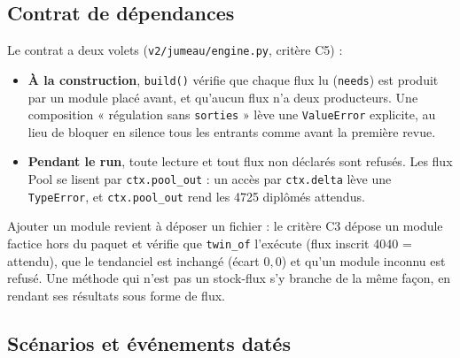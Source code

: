 \subsection{Contrat de dépendances}\label{jum:contrat}

Le contrat a deux volets (\texttt{v2/jumeau/engine.py}, critère C5) :
\begin{itemize}
  \item \textbf{À la construction}, \texttt{build()} vérifie que chaque flux lu (\texttt{needs}) est produit par
        un module placé avant, et qu'aucun flux n'a deux producteurs. Une composition « régulation sans
        \texttt{sorties} » lève une \texttt{ValueError} explicite\mesure{}, au lieu de bloquer en silence tous
        les entrants comme avant la première revue.
  \item \textbf{Pendant le run}, toute lecture et tout flux non déclarés sont refusés. Les flux Pool se lisent
        par \texttt{ctx.pool\_out} : un accès par \texttt{ctx.delta} lève une \texttt{TypeError}\mesure{}, et
        \texttt{ctx.pool\_out} rend les \num{4725}\mesure{} diplômés attendus.
\end{itemize}
Ajouter un module revient à déposer un fichier : le critère C3 dépose un module factice hors du paquet et
vérifie que \texttt{twin\_of} l'exécute (flux inscrit \num{4040}\mesure{} = attendu), que le tendanciel est
inchangé (écart $0{,}0$\mesure{}) et qu'un module inconnu est refusé. Une méthode qui n'est pas un stock-flux s'y
branche de la même façon, en rendant ses résultats sous forme de flux.

\subsection{Scénarios et événements datés}\label{jum:scenario}

